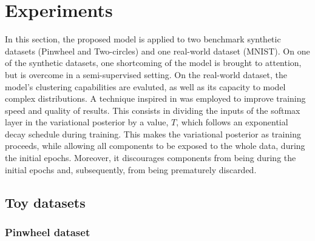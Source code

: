 \section{Experiments}
\label{section:experiments}

In this section, the proposed model is applied to two benchmark synthetic datasets (Pinwheel
and Two-circles) and one real-world dataset (MNIST). On one of the synthetic
datasets, one shortcoming of the model is brought to attention, but is overcome
in a semi-supervised setting. On the real-world dataset, the model's clustering
capabilities are evaluted, as well as its capacity to model complex distributions.
A technique inspired in \autocite{mixae} was employed to improve training
speed and quality of results. This consists in dividing the inputs of the softmax layer in
the variational posterior by a  value, $T$, which follows
an exponential decay schedule during training. This makes the
variational posterior  as training proceeds, while allowing all
components to be exposed to the whole data, during the initial epochs.
Moreover, it discourages components from being  during the initial epochs
and, subsequently, from being prematurely discarded.

\subsection{Toy datasets}
\subsubsection{Pinwheel dataset}

